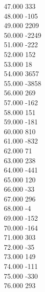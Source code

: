 { 47.000	333 \\
 48.000	-105 \\
 49.000	2209 \\
 50.000	-2249 \\
 51.000	-222 \\
 52.000	152 \\
 53.000	18 \\
 54.000	3657 \\
 55.000	-3858 \\
 56.000	269 \\
 57.000	-162 \\
 58.000	151 \\
 59.000	-181 \\
 60.000	810 \\
 61.000	-832 \\
 62.000	71 \\
 63.000	238 \\
 64.000	-441 \\
 65.000	120 \\
 66.000	-33 \\
 67.000	296 \\
 68.000	-4 \\
 69.000	-152 \\
 70.000	-164 \\
 71.000	303 \\
 72.000	-35 \\
 73.000	149 \\
 74.000	-111 \\
 75.000	-330 \\
 76.000	293 \\
}
